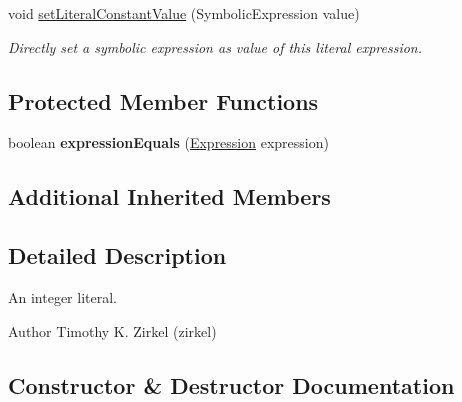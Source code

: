 \begin{DoxyCompactItemize}
\item 
void \hyperlink{classedu_1_1udel_1_1cis_1_1vsl_1_1civl_1_1model_1_1common_1_1expression_1_1CommonIntegerLiteralExpression_a82e644a396b68e98a4709af0aad84a6d}{set\+Literal\+Constant\+Value} (Symbolic\+Expression value)
\begin{DoxyCompactList}\small\item\em Directly set a symbolic expression as value of this literal expression. \end{DoxyCompactList}\end{DoxyCompactItemize}
\subsection*{Protected Member Functions}
\begin{DoxyCompactItemize}
\item 
\hypertarget{classedu_1_1udel_1_1cis_1_1vsl_1_1civl_1_1model_1_1common_1_1expression_1_1CommonIntegerLiteralExpression_a8d44ec64ba8318e0ea3b64463013c7e9}{}boolean {\bfseries expression\+Equals} (\hyperlink{interfaceedu_1_1udel_1_1cis_1_1vsl_1_1civl_1_1model_1_1IF_1_1expression_1_1Expression}{Expression} expression)\label{classedu_1_1udel_1_1cis_1_1vsl_1_1civl_1_1model_1_1common_1_1expression_1_1CommonIntegerLiteralExpression_a8d44ec64ba8318e0ea3b64463013c7e9}

\end{DoxyCompactItemize}
\subsection*{Additional Inherited Members}


\subsection{Detailed Description}
An integer literal. 

\begin{DoxyAuthor}{Author}
Timothy K. Zirkel (zirkel) 
\end{DoxyAuthor}


\subsection{Constructor \& Destructor Documentation}
\hypertarget{classedu_1_1udel_1_1cis_1_1vsl_1_1civl_1_1model_1_1common_1_1expression_1_1CommonIntegerLiteralExpression_a8cbbdd6cc0e548bf9afd90488a55b6fb}{}

